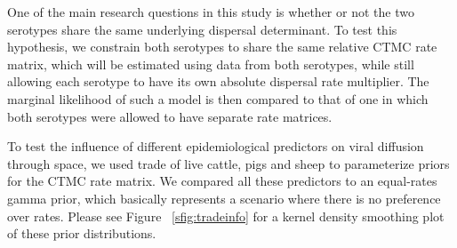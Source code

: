 \documentclass[10pt]{article}
\begin{document}
One of the main research questions in this study is whether or not the two serotypes share the same underlying dispersal determinant. 
To test this hypothesis, we constrain both serotypes to share the same relative CTMC rate matrix, which will be estimated using data from both serotypes,
%
while still allowing each serotype to have its own absolute dispersal rate multiplier.
The marginal likelihood of such a model is then compared to that of one in which both serotypes were allowed to have separate rate matrices.

To test the influence of different epidemiological predictors on viral diffusion through space, we used trade of live cattle, pigs and sheep to parameterize priors for the CTMC rate matrix.
We compared all these  predictors to an equal-rates  gamma prior, which basically represents a scenario where there is no preference over rates.
Please see Figure ~\ref{sfig:tradeinfo} for a kernel density smoothing plot of these prior distributions.
\end{document}

